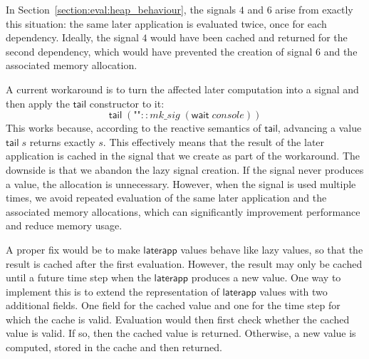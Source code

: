 In Section~\ref{section:eval:heap_behaviour}, the signals $4$ and $6$ arise from exactly this situation: the same later application is evaluated twice, once for each dependency. Ideally, the signal $4$ would have been cached and returned for the second dependency, which would have prevented the creation of signal $6$ and the associated memory allocation. 

A current workaround is to turn the affected later computation into a signal and then apply the $\mathsf{tail}$ constructor to it:
\[
\mathsf{tail} \; (\texttt{""} :: mk\_sig \; (\mathsf{wait} \; console))
\]
This works because, according to the reactive semantics of $\mathsf{tail}$, advancing a value $\mathsf{tail} \; s$ returns exactly $s$.
This effectively means that the result of the later application is cached in the signal that we create as part of the workaround.
The downside is that we abandon the lazy signal creation. If the signal never produces a value, the allocation is unnecessary.
However, when the signal is used multiple times, we avoid repeated evaluation of the same later application and the associated memory allocations, which can significantly improvement performance and reduce memory usage.

A proper fix would be to make $\mathsf{laterapp}$ values behave like lazy values, so that the result is cached after the first evaluation.
However, the result may only be cached until a future time step when the $\mathsf{laterapp}$ produces a new value.
One way to implement this is to extend the representation of $\mathsf{laterapp}$ values with two additional fields. One field for the cached value and one for the time step for which the cache is valid.
Evaluation would then first check whether the cached value is valid. If so, then the cached value is returned. Otherwise, a new value is computed, stored in the cache and then returned.

